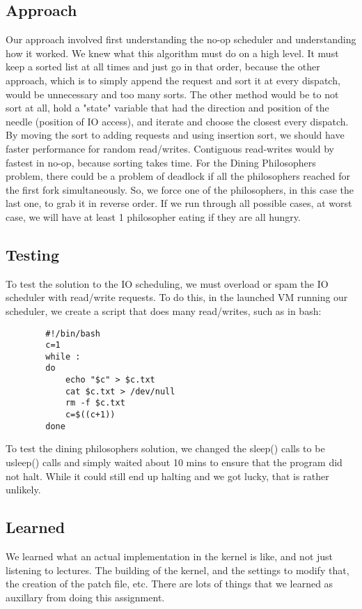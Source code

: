 \documentclass[letterpaper,10pt]{article}
\begin{document}
	\subsection{Approach}
	Our approach involved first understanding the no-op scheduler and understanding how it worked. We knew what this algorithm must do on a high level. It must keep a sorted list at all times and just go in that order, because the other approach, which is to simply append the request and sort it at every dispatch, would be unnecessary and too many sorts. The other method would be to not sort at all, hold a "state" variable that had the direction and position of the needle (position of IO access), and iterate and choose the closest every dispatch. By moving the sort to adding requests and using insertion sort, we should have faster performance for random read/writes. Contiguous read-writes would by fastest in no-op, because sorting takes time.
	For the Dining Philosophers problem, there could be a problem of deadlock if all the philosophers reached for the first fork simultaneously. So, we force one of the philosophers, in this case the last one, to grab it in reverse order. If we run through all possible cases, at worst case, we will have at least 1 philosopher eating if they are all hungry.
	
	\subsection{Testing}
	To test the solution to the IO scheduling, we must overload or spam the IO scheduler with read/write requests. To do this, in the launched VM running our scheduler, we create a script that does many read/writes, such as in bash:
	\begin{verbatim}
		#!/bin/bash
		c=1
		while : 
		do
			echo "$c" > $c.txt
			cat $c.txt > /dev/null
			rm -f $c.txt
			c=$((c+1))
		done
	\end{verbatim}
	To test the dining philosophers solution, we changed the sleep() calls to be usleep() calls and simply waited about 10 mins to ensure that the program did not halt. While it could still end up halting and we got lucky, that is rather unlikely.
	
	\subsection{Learned}
	We learned what an actual implementation in the kernel is like, and not just listening to lectures. The building of the kernel, and the settings to modify that, the creation of the patch file, etc. There are lots of things that we learned as auxillary from doing this assignment.
\end{document}
